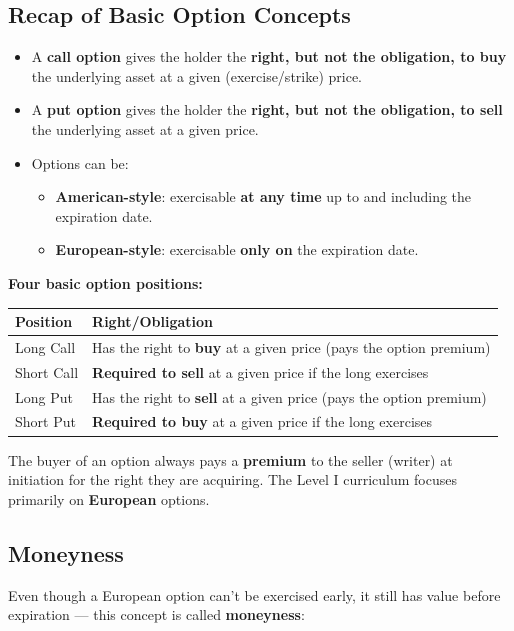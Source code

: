 \documentclass[12pt,openany]{book}
\theoremstyle{definition}
\theoremstyle{remark}
\begin{document}
\subsection{Recap of Basic Option Concepts}

\begin{itemize}
\item A \textbf{call option} gives the holder the \textbf{right, but not the obligation, to buy} the underlying asset at a given (exercise/strike) price.
\item A \textbf{put option} gives the holder the \textbf{right, but not the obligation, to sell} the underlying asset at a given price.
\item Options can be:
\begin{itemize}
\item \textbf{American-style}: exercisable \textbf{at any time} up to and including the expiration date.
\item \textbf{European-style}: exercisable \textbf{only on} the expiration date.
\end{itemize}
\end{itemize}
\textbf{Four basic option positions:}

{\small
\begin{longtable}{@{}L{0.28\textwidth}L{0.64\textwidth}@{}}
\toprule
\textbf{Position} & \textbf{Right/Obligation} \\
\midrule
Long Call & Has the right to \textbf{buy} at a given price (pays the option premium) \\
Short Call & \textbf{Required to sell} at a given price if the long exercises \\
Long Put & Has the right to \textbf{sell} at a given price (pays the option premium) \\
Short Put & \textbf{Required to buy} at a given price if the long exercises \\
\bottomrule
\end{longtable}
}

The buyer of an option always pays a \textbf{premium} to the seller (writer) at initiation for the right they are acquiring. The Level I curriculum focuses primarily on \textbf{European} options.

\subsection{Moneyness}

Even though a European option can't be exercised early, it still has value before expiration — this concept is called \textbf{moneyness}:
\end{document}
